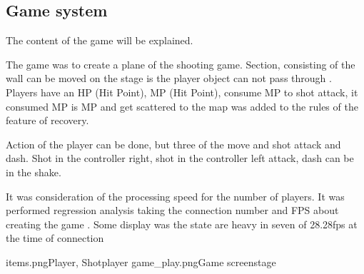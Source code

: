 \subsection{Game system}

The content of the game will be explained.

The game was to create a plane of the shooting game. Section, consisting of the wall can be moved on the stage is the player  object can not pass through .
Players have an HP (Hit Point), MP (Hit Point), consume MP to shot attack, it consumed MP is MP and get scattered to the map was added to the rules of the feature of recovery.

Action of the player can be done, but three of the move and shot attack and dash. Shot in the controller right, shot in the controller left attack, dash can be in the shake.

It was consideration of the processing speed for the number of players. It was performed regression analysis taking the connection number and FPS about creating the game .
Some display was the state are heavy in seven of 28.28fps at the time of connection

\myfigtwo
{items.png}{Player, Shot}{player}
{game_play.png}{Game screen}{stage}



